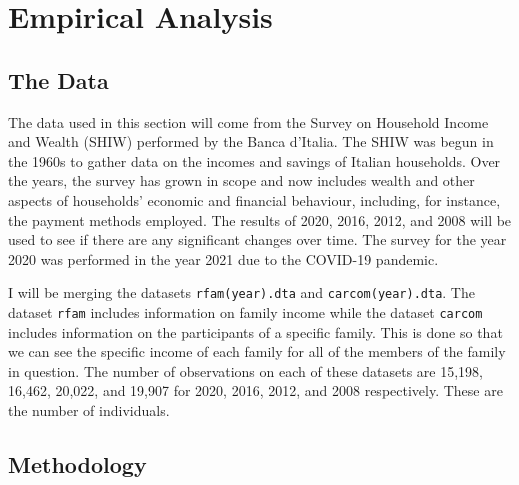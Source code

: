 \documentclass[12pt]{article}
\begin{document}
\section{Empirical Analysis}

\subsection{The Data}

\begin{spacing}{1.5}

The data used in this section will come from the Survey on Household Income and Wealth (SHIW) performed by the Banca d'Italia.  The SHIW was begun in the 1960s to gather data on the incomes and savings of Italian households. Over the years, the survey has grown in scope and now includes wealth and other aspects of households' economic and financial behaviour, including, for instance, the payment methods employed. The results of 2020, 2016, 2012, and 2008 will be used to see if there are any significant changes over time. The survey for the year 2020 was performed in the year 2021 due to the COVID-19 pandemic. 


I will be merging the datasets \verb+rfam(year).dta+ and \verb+carcom(year).dta+. The dataset \verb+rfam+ includes information on family income while the dataset \verb+carcom+ includes information on the participants of a specific family. This is done so that we can see the specific income of each family for all of the members of the family in question. The number of observations on each of these datasets are 15,198, 16,462, 20,022, and 19,907 for 2020, 2016, 2012, and 2008 respectively. These are the number of individuals.

\end{spacing}

\subsection{Methodology}
\end{document}
